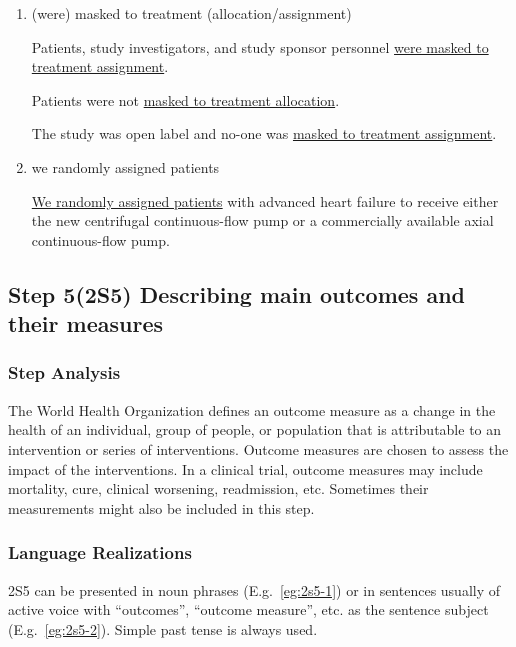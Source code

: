 \documentclass[a4paper]{ctexbook}
\begin{document}
\begin{enumerate}
      \item (were) masked to treatment (allocation/assignment)
      \begin{eg}{}
        Patients, study investigators, and study sponsor personnel \uline{were masked to treatment assignment}.
      \end{eg}
      \begin{eg}{}
        Patients were not \uline{masked to treatment allocation}.
      \end{eg}
      \begin{eg}{}
        The study was open label and no-one was \uline{masked to treatment assignment}.
      \end{eg}

      \item we randomly assigned patients
      \begin{eg}{}
        \uline{We randomly assigned patients} with advanced heart failure to receive either the new centrifugal continuous-flow pump or a commercially available axial continuous-flow pump.
      \end{eg}
    \end{enumerate}

  \subsection{Step 5(2S5) Describing main outcomes and their measures}

    \subsubsection{Step Analysis}

    The World Health Organization defines an outcome measure as a change in the health of an individual, group of people, or population that is attributable to an intervention or series of interventions. Outcome measures are chosen to assess the impact of the interventions. In a clinical trial, outcome measures may include mortality, cure, clinical worsening, readmission, etc. Sometimes their measurements might also be included in this step.

    \subsubsection{Language Realizations}

    2S5 can be presented in noun phrases (E.g.~\ref{eg:2s5-1}) or in sentences usually of active voice with ``outcomes'', ``outcome measure'', etc. as the sentence subject (E.g.~\ref{eg:2s5-2}). Simple past tense is always used.
\end{document}
